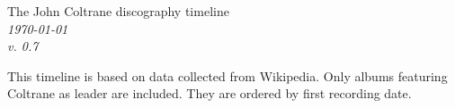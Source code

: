 \documentclass[a4paper, landscape]{article}
\newcounter{timelineend}
\newlength\legendx
\newcommand\makethelegend{
\small
    \node at (\legendx, 4.3) 
        [legend, anchor=north east] (recorddatelegend) 
        {First recording date} ;

    \node at (\legendx, 4.5) 
        [legend, anchor=south east, color=gray] 
        {Release year\\(if other than first rec.)};

    \node at (\legendx, 3.65) [legend, anchor=east] {*\,=\,live};

        \def\nodecolor{black}

    \node at (\legendx, 3.1) [anchor=east] {Album};

    \node at (\legendx, 2.8) [inner sep=1.5pt, legend, anchor=north east] (albumlegend) {Record label} ;

    \foreach \l/\c in 
        {Prestige/red,
        Blue~Note/blue,
        Savoy/violet,
        Atlantic/green,
        Pablo/black,
        Impulse!/orange}
        {
            \node at (albumlegend.south east) 
                [inner sep=1.5pt, legend, rounded corners, draw=\c!40, fill=\c!10, anchor=north east]
                (albumlegend) {\l\vphantom{jk}};
        }

        \node at (\legendx, -0.8cm) 
            [anchor=north east]
            {Personnel};

        \node at (\legendx,-3)
            [legend, anchor=east]
            {Other\\recording\\dates};
}
\begin{document}
\thispagestyle{empty}

\begin{minipage}[t]{.4\textwidth}
    {\huge The John Coltrane discography timeline}\\[\medskipamount]
    \textit{\today\\v. 0.7}
\end{minipage}
\hfill
\begin{minipage}[t]{.3\textwidth}
\large
This timeline is based on data collected from Wikipedia. Only albums featuring Coltrane as leader are included. They are ordered by first recording date.
\end{minipage}


\vfill

\center


\end{document}
